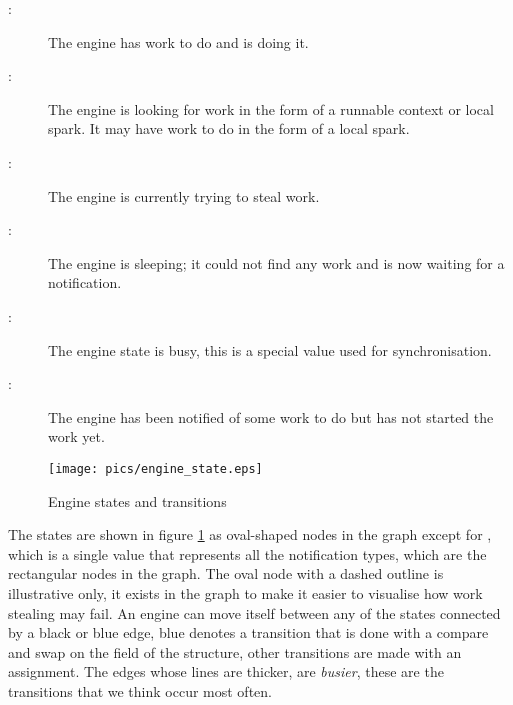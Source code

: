 \begin{description}
    \item[:] The engine has work to do and is doing it.

    \item[:] The engine is looking for work in
        the form of a runnable context or local spark.  It may have work to
        do in the form of a local spark.

    \item[:] The engine is currently trying to steal work.

    \item[:] The engine is sleeping; it could not find any
        work and is now waiting for a notification.

    \item[:] The engine state is busy, this is a special value
        used for synchronisation.

    \item[:] The engine has been notified of some work to
        do but has not started the work yet.
\end{description}

\begin{figure}
\begin{center}
\texttt{[image: pics/engine\_state.eps]}
\end{center}
\caption{Engine states and transitions}
\label{fig:engine_states}
\end{figure}

\noindent
{}
The states are shown in figure \ref{fig:engine_states} as oval-shaped nodes
in the graph except for ,
which is a single value that represents all the notification types,
which are the rectangular nodes in the graph.
The oval node with a dashed outline is illustrative only,
it exists in the graph to make it easier to visualise how work stealing may
fail.
An engine can move itself between any of the states connected by a black or
blue edge,
blue denotes a transition that is done with a compare and swap on the
 field of the \enginesleepsync structure,
other transitions are made with an assignment.
The edges whose lines are thicker, are \emph{busier},
these are the transitions that we think occur most often.

